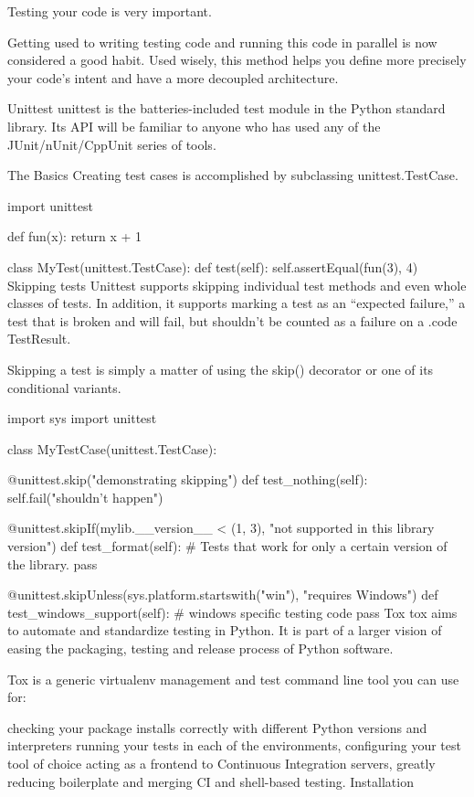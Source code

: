Testing your code is very important.

Getting used to writing testing code and running this code in parallel is now considered a good habit. Used wisely, this method helps you define more precisely your code’s intent and have a more decoupled architecture.

Unittest
unittest is the batteries-included test module in the Python standard library. Its API will be familiar to anyone who has used any of the JUnit/nUnit/CppUnit series of tools.

The Basics
Creating test cases is accomplished by subclassing unittest.TestCase.

import unittest

def fun(x):
    return x + 1

class MyTest(unittest.TestCase):
    def test(self):
        self.assertEqual(fun(3), 4)
Skipping tests
Unittest supports skipping individual test methods and even whole classes of tests. In addition, it supports marking a test as an “expected failure,” a test that is broken and will fail, but shouldn’t be counted as a failure on a .code TestResult.

Skipping a test is simply a matter of using the skip() decorator or one of its conditional variants.

import sys
import unittest

class MyTestCase(unittest.TestCase):

    @unittest.skip("demonstrating skipping")
    def test_nothing(self):
        self.fail("shouldn't happen")

    @unittest.skipIf(mylib.__version__ < (1, 3),
                     "not supported in this library version")
    def test_format(self):
        # Tests that work for only a certain version of the library.
        pass

    @unittest.skipUnless(sys.platform.startswith("win"), "requires Windows")
    def test_windows_support(self):
        # windows specific testing code
        pass
Tox
tox aims to automate and standardize testing in Python. It is part of a larger vision of easing the packaging, testing and release process of Python software.

Tox is a generic virtualenv management and test command line tool you can use for:

checking your package installs correctly with different Python versions and interpreters
running your tests in each of the environments, configuring your test tool of choice
acting as a frontend to Continuous Integration servers, greatly reducing boilerplate and merging CI and shell-based testing.
Installation

